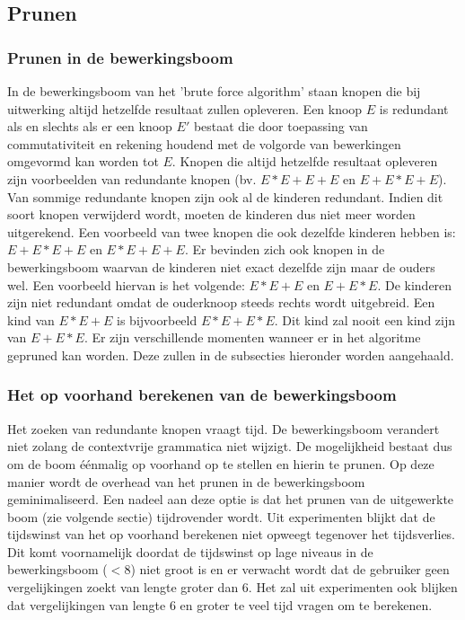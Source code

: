 \documentclass[Main.tex]{subfiles}
\begin{document}
\subsection{Prunen} \label{ssec:Prunen}
\subsubsection*{Prunen in de bewerkingsboom}
In de bewerkingsboom van het 'brute force algorithm' staan knopen die bij uitwerking altijd hetzelfde resultaat zullen opleveren. Een knoop $E$ is redundant als en slechts als er een knoop $E'$ bestaat die door toepassing van commutativiteit en rekening houdend met de volgorde van bewerkingen omgevormd kan worden tot $E$. Knopen die altijd hetzelfde resultaat opleveren zijn voorbeelden van redundante knopen (bv.  $E \ast E+E+E$ en $E+E \ast E +E$). Van sommige redundante knopen zijn ook al de kinderen redundant. Indien dit soort knopen verwijderd wordt, moeten de kinderen dus niet meer worden uitgerekend. Een voorbeeld van twee knopen die ook dezelfde kinderen hebben is: $E+E \ast E+E$ en $E \ast E+E+E$. Er bevinden zich ook knopen in de bewerkingsboom waarvan de kinderen niet exact dezelfde zijn maar de ouders wel. Een voorbeeld hiervan is het volgende: $E \ast E+E$ en $E+E \ast E$. De kinderen zijn niet redundant omdat de ouderknoop steeds rechts wordt uitgebreid. Een kind van $E \ast E+E$ is bijvoorbeeld $E \ast E+E \ast E$. Dit kind zal nooit een kind zijn van $E+E \ast E$. Er zijn verschillende momenten wanneer er in het algoritme gepruned kan worden. Deze zullen in de subsecties hieronder worden aangehaald.

\subsubsection*{Het op voorhand berekenen van de bewerkingsboom}
Het zoeken van redundante knopen vraagt tijd. De bewerkingsboom verandert niet zolang de contextvrije grammatica niet wijzigt. De mogelijkheid bestaat dus om de boom \'e\'enmalig op voorhand op te stellen en hierin te prunen. Op deze manier wordt de overhead van het prunen in de bewerkingsboom geminimaliseerd. Een nadeel aan deze optie is dat het prunen van de uitgewerkte boom (zie volgende sectie) tijdrovender wordt. Uit experimenten blijkt dat de tijdswinst van het op voorhand berekenen niet opweegt tegenover het tijdsverlies. Dit komt voornamelijk doordat de tijdswinst op lage niveaus in de bewerkingsboom ($< 8$) niet groot is en er verwacht wordt dat de gebruiker geen vergelijkingen zoekt van lengte groter dan 6. Het zal uit experimenten ook blijken dat vergelijkingen van lengte 6 en groter te veel tijd vragen om te berekenen. 
\end{document}
